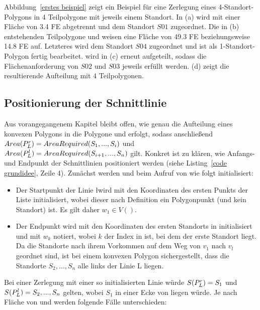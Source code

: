 \documentclass[ngerman]{seminarbeitrag}
\begin{document}
Abbildung~\ref{erstes beispiel} zeigt ein Beispiel für eine Zerlegung eines 4-Standort-Polygons in 4 Teilpolygone mit jeweils einem Standort. In (a) wird \prl mit einer Fläche von 3.4 FE abgetrennt und dem Standort $S01$ zugeordnet. Die in (b) entstehenden Teilpolygone \prl und \pll weisen eine Fläche von 49.3 FE beziehungsweise 14.8 FE auf. Letzteres wird dem Standort $S04$ zugeordnet und ist als 1-Standort-Polygon fertig bearbeitet. \prl wird in (c) erneut aufgeteilt, sodass die Flächenanforderung von $S02$ und $S03$ jeweils erfüllt werden. (d) zeigt die resultierende Aufteilung mit 4 Teilpolygonen.  


\subsection{Positionierung der Schnittlinie}\label{schnittlinie konvex}

Aus vorangegangenem Kapitel bleibt offen, wie genau die Aufteilung eines konvexen Polygons \cp in die Polygone \prl und \pll erfolgt, sodass anschließend
$Area(P_{L}^{r})=AreaRequired(S_{1},...,S_{i})$ und $Area(P_{L}^{l})=AreaRequired(S_{i+1},...,S_{n}) $ gilt.
Konkret ist zu klären, wie Anfangs- und Endpunkt der Schnittlinien positioniert werden (siehe Listing~\ref{code grundidee}, Zeile 4). Zunächst werden \ls und \Le beim Aufruf von \con wie folgt initialisiert:

\begin{itemize}
\item Der Startpunkt \ls der Linie \l wird mit den Koordinaten des ersten Punkts der Liste \w initialisiert, wobei dieser nach Definition ein Polygonpunkt (und
kein Standort) ist. Es gilt daher $w_{1} \in V()$.
\item Der Endpunkt \Le wird mit den Koordinaten des ersten Standorts in \w initialisiert und mit $w_{k}$ notiert, wobei $k$ der Index in \w ist, bei dem der
erste Standort liegt. Da die Standorte nach ihrem Vorkommen auf dem Weg von $v_{1}$ nach $v_{l}$ geordnet sind, ist bei einem konvexen Polygon sichergestellt,
dass die Standorte $S_{2},…,S_{n}$ alle links der Linie L liegen.
\end{itemize}

Bei einer Zerlegung mit einer so initialisierten Linie würde $S(P_{L}^{r})=S_{1}$ und $S(P_{L}^{l})=S_{2},...,S_{n}$ gelten, wobei $S_{1}$ in einer Ecke von \prl
liegen würde. Je nach Fläche von \prl und  werden folgende Fälle unterschieden: \\
\end{document}
